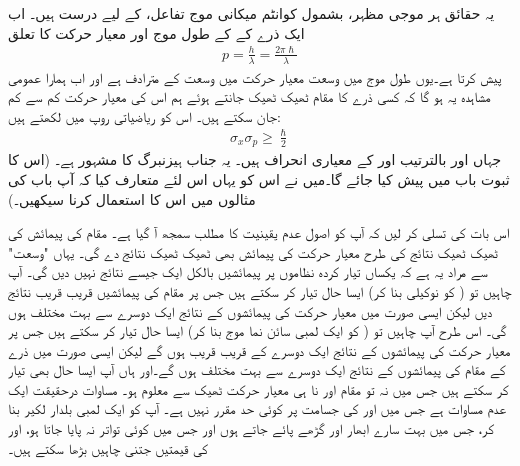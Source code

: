  یہ حقائق ہر موجی مظہر، بشمول کوانٹم میکانی موج تفاعل، کے لیے درست ہیں۔ اب ایک ذرے کے  کے طول موج اور  معیار حرکت کا تعلق  
\begin{align}\label{مساوات_تفاعل_موج_ڈی_بروگلی_معیار_حرکت}
p=\frac{h}{\lambda}=\frac{2\pi\hslash}{\lambda}
\end{align}
پیش کرتا ہے۔یوں طول موج میں وسعت  معیار حرکت میں  وسعت  کے مترادف  ہے اور  اب ہمارا عمومی مشاہدہ  یہ  ہو گا کہ کسی ذرے کا مقام ٹھیک ٹھیک جانتے ہوئے ہم اس کی معیار حرکت  کم سے کم  جان سکتے ہیں۔ اس کو ریاضیاتی روپ میں لکھتے ہیں:
\begin{align}\label{مساوات_تفاعل_موج_اصول_عدم_یقینیت}
\sigma_{x}\sigma_{p}\ge\frac{\hslash}{2}
\end{align}
جہاں  اور  بالترتیب  اور  کے معیاری انحراف ہیں۔ یہ جناب ہیزنبرگ کا مشہور   ہے۔ (اس کا ثبوت  باب  میں پیش کیا جائے گا۔میں نے اس کو یہاں اس لئے متعارف کیا کہ آپ باب  کی مثالوں میں اس کا استعمال کرنا سیکھیں۔)

 اس بات کی تسلی کر لیں کہ آپ کو اصول عدم یقینیت کا مطلب سمجھ آ گیا ہے۔  مقام کی پیمائش کی ٹھیک ٹھیک نتائج کی طرح معیار حرکت کی پیمائش بھی ٹھیک ٹھیک نتائج دے گی۔ یہاں  "وسعت" سے مراد یہ ہے کہ یکساں تیار کردہ  نظاموں پر پیمائشیں  بالکل ایک جیسے نتائج  نہیں دیں گی۔  آپ چاہیں تو ( کو نوکیلی بنا کر) ایسا حال تیار کر سکتے ہیں جس پر مقام کی پیمائشیں قریب قریب نتائج  دیں لیکن ایسی صورت میں معیار حرکت کی پیمائشوں کے نتائج ایک دوسرے سے بہت مختلف ہوں گی۔ اس طرح آپ چاہیں تو ( کو ایک لمبی سائن نما موج بنا کر) ایسا حال تیار کر سکتے ہیں جس پر معیار حرکت کی پیمائشوں کے نتائج ایک دوسرے کے قریب قریب ہوں گے لیکن ایسی صورت میں ذرے کے مقام کی پیمائشوں کے نتائج ایک دوسرے سے بہت مختلف ہوں گے۔اور ہاں آپ ایسا حال بھی تیار کر سکتے ہیں جس میں نہ تو مقام  اور نا ہی معیار حرکت ٹھیک سے معلوم ہو۔ مساوات  درحقیقت ایک عدم مساوات ہے جس میں  اور  کی جسامت پر کوئی حد مقرر نہیں ہے۔ آپ  کو ایک لمبی بلدار لکیر بنا کر، جس میں بہت سارے ابھار اور گڑھے پائے جاتے ہوں اور جس میں کوئی تواتر نہ پایا جاتا ہو،  اور  کی قیمتیں جتنی چاہیں بڑھا سکتے ہیں۔


